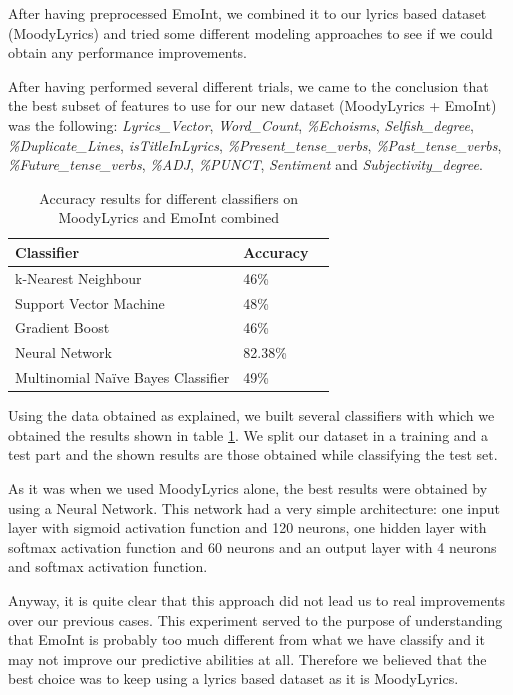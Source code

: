 After having preprocessed EmoInt, we combined it to our lyrics based dataset (MoodyLyrics) and tried some different
modeling approaches to see if we could obtain any performance improvements.

After having performed several different trials, we came to the conclusion that the best subset of features
to use for our new dataset (MoodyLyrics + EmoInt) was the following: \textit{Lyrics\_Vector}, \textit{Word\_Count}, 
\textit{\%Echoisms}, \textit{Selfish\_degree}, \textit{\%Duplicate\_Lines}, \textit{isTitleInLyrics}, 
\textit{\%Present\_tense\_verbs}, \textit{\%Past\_tense\_verbs}, \textit{\%Future\_tense\_verbs},
\textit{\%ADJ}, \textit{\%PUNCT}, \textit{Sentiment} and \textit{Subjectivity\_degree}.

\begin{table}[H]
\centering
\begin{tabular}{@{}lll@{}}
\toprule
\textbf{Classifier} & \textbf{Accuracy}   \\ \midrule
k-Nearest Neighbour & 46\%  \\
Support Vector Machine & 48\%  \\
Gradient Boost & 46\%  \\
Neural Network & 82.38\%  \\
Multinomial Na\"{i}ve Bayes Classifier & 49\%  \\ \bottomrule
\end{tabular}
\caption{Accuracy results for different classifiers on MoodyLyrics and EmoInt combined}
\label{table:emoint-results}
\end{table}

Using the data obtained as explained, we built several classifiers with which we obtained the results
shown in table \ref{table:emoint-results}. We split our dataset
in a training and a test part and the shown results are those obtained while classifying the test set.

As it was when we used MoodyLyrics alone, the best results were obtained by using a Neural Network.
This network had a very simple architecture: one input layer with sigmoid activation function and 120 neurons,
one hidden layer with softmax activation function and 60 neurons and an output layer with 4 neurons and softmax
activation function.

Anyway, it is quite clear that this approach did not lead us to real improvements over our previous cases.
This experiment served to the purpose of understanding that EmoInt is probably too much different from what 
we have classify and it may not improve our predictive abilities at all. Therefore we believed that the best
choice was to keep using a lyrics based dataset as it is MoodyLyrics.

